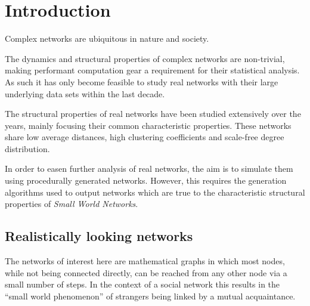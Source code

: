 \documentclass[a4paper,11pt,titlepage]{article}
\let\stdsection\section         %
\renewcommand{\section}{\newpage\stdsection}
\begin{document}
\tableofcontents



\section{Introduction}


Complex networks are ubiquitous in nature and society.

The dynamics and structural properties of complex networks are non-trivial,
making performant computation gear a requirement for their statistical
analysis. As such it has only become feasible to study real networks with their
large underlying data sets within the last decade.  \cite{oconn11}

The structural properties of real networks have been studied extensively over
the years, mainly focusing their common characteristic properties.  These
networks share low average distances, high clustering coefficients and
scale-free degree distribution.

In order to easen further analysis of real networks, the aim is to simulate them
using procedurally generated networks. However, this requires the generation
algorithms used to output networks which are true to the characteristic
structural properties of \emph{Small World Networks}.

\subsection{Realistically looking networks}


The networks of interest here are mathematical graphs in which most nodes, while
not being connected directly, can be reached from any other node via a small
number of steps. In the context of a social network this results in the ``small
world phenomenon'' \cite{swphen} of strangers being linked by a mutual
acquaintance.
\end{document}
